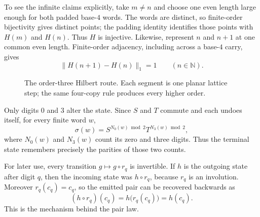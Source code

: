 \documentclass[11pt]{article}
\theoremstyle{definition}
\theoremstyle{remark}
\newcommand{\N}{\mathbb N}
\newcommand{\norm}[1]{\lVert#1\rVert}
\begin{document}
To see the infinite claims explicitly, take $m\neq n$ and choose one even
length large enough for both padded base-$4$ words.  The words are distinct,
so finite-order bijectivity gives distinct points; the padding identity
identifies those points with $H(m)$ and $H(n)$.  Thus $H$ is injective.
Likewise, represent $n$ and $n+1$ at one common even length.  Finite-order
adjacency, including across a base-$4$ carry, gives
\begin{equation}\label{eq:unit-step}
 \norm{H(n+1)-H(n)}_1=1\qquad(n\in\N).
\end{equation}

\begin{figure}[htbp]
\centering
{}
\caption{The order-three Hilbert route.  Each segment is one planar lattice
step; the same four-copy rule produces every higher order.}
\label{fig:hilbert-trace}
\end{figure}

Only digits $0$ and $3$ alter the state.  Since $S$ and $T$ commute and each
undoes itself, for every finite word $w$,
\begin{equation}\label{eq:sigma-word}
 \sigma(w)=S^{N_0(w)\bmod2}T^{N_3(w)\bmod2},
\end{equation}
where $N_0(w)$ and $N_3(w)$ count its zero and three digits.  Thus the
terminal state remembers precisely the parities of those two counts.

For later use, every transition $g\mapsto g\circ r_q$ is invertible.  If $h$
is the outgoing state after digit $q$, then the incoming state was
$h\circ r_q$, because $r_q$ is an involution.  Moreover $r_q(c_q)=c_q$, so
the emitted pair can be recovered backwards as
\begin{equation}\label{eq:backward-emission}
 (h\circ r_q)(c_q)=h\bigl(r_q(c_q)\bigr)=h(c_q).
\end{equation}
This is the mechanism behind the pair law.
\end{document}
